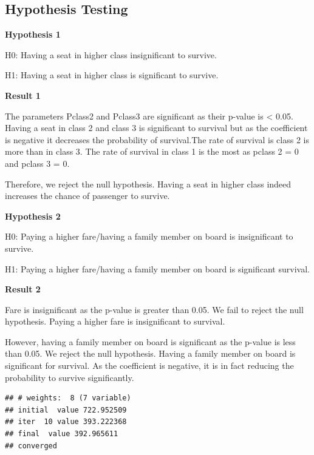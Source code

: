\documentclass[
]{article}
\begin{document}
\hypertarget{hypothesis-testing}{%
\subsection{Hypothesis Testing}\label{hypothesis-testing}}

\textbf{Hypothesis 1}

H0: Having a seat in higher class insignificant to survive.

H1: Having a seat in higher class is significant to survive.

\textbf{Result 1}

The parameters Pclass2 and Pclass3 are significant as their p-value is
\textless{} 0.05. Having a seat in class 2 and class 3 is significant to
survival but as the coefficient is negative it decreases the probability
of survival.The rate of survival is class 2 is more than in class 3. The
rate of survival in class 1 is the most as pclass 2 = 0 and pclass 3 =
0.

Therefore, we reject the null hypothesis. Having a seat in higher class
indeed increases the chance of passenger to survive.

\textbf{Hypothesis 2}

H0: Paying a higher fare/having a family member on board is
insignificant to survive.

H1: Paying a higher fare/having a family member on board is significant
survival.

\textbf{Result 2}

Fare is insignificant as the p-value is greater than 0.05. We fail to
reject the null hypothesis. Paying a higher fare is insignificant to
survival.

However, having a family member on board is significant as the p-value
is less than 0.05. We reject the null hypothesis. Having a family member
on board is significant for survival. As the coefficient is negative, it
is in fact reducing the probability to survive significantly.

\begin{verbatim}
## # weights:  8 (7 variable)
## initial  value 722.952509 
## iter  10 value 393.222368
## final  value 392.965611 
## converged
\end{verbatim}
\end{document}
